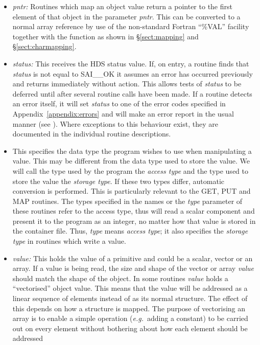 \documentclass[twoside,11pt]{starlink}
\providecommand{\qt}[1]{``#1''}
\providecommand{\st}[1]{{\emph{#1}}}
\begin{document}
\begin{itemize}
\item \st{pntr:}
Routines which map an object value return a pointer to the first
element of that object in the parameter \st{pntr}. This can be
converted to a normal array reference by use of the non-standard
Fortran \qt{\%VAL} facility together with the
 function as shown in
\S\ref{sect:mapping} and \S\ref{sect:charmapping}.

\item \st{status:}
This receives the HDS status value. If, on entry, a routine finds that
\st{status} is not equal to SAI\_\_OK it assumes an error has
occurred previously and returns immediately without action. This
allows tests of \st{status} to be deferred until after several
routine calls have been made. If a routine detects an error itself, it
will set \st{status} to one of the error codes specified in
Appendix~\ref{appendix:errors} and will make an error report in the
usual manner (see ). Where exceptions to this
behaviour exist, they are documented in the individual routine
descriptions.

\item \htmlref{\st{type:}}{sect:type}
This specifies the data type the program wishes to use when
manipulating a value. This may be different from the data type used to
store the value. We will call the type used by the program the
\st{access type} and the type used to store the value the \st{storage
type}. If these two types differ, automatic conversion is
performed. This is particularly relevant to the GET, PUT and MAP
routines. The types specified in the names or the \st{type} parameter
of these routines refer to the access type, thus
 will read a scalar component and
present it to the program as an integer, no matter how that value is
stored in the container file. Thus, \st{type} means \st{access type};
it also specifies the \st{storage type} in routines which write a
value.

\item \st{value:}
This holds the value of a primitive and could be a scalar, vector or
an array.  If a value is being read, the size and shape of the vector
or array \st{value} should match the shape of the object. In some
routines \st{value} holds a \qt{vectorised} object value. This means
that the value will be addressed as a linear sequence of elements
instead of as its normal structure. The effect of this depends on how
a structure is mapped. The purpose of vectorising an array is to
enable a simple operation (\st{e.g.}\ adding a constant) to be carried
out on every element without bothering about how each element should
be addressed

\end{itemize}
\end{document}
